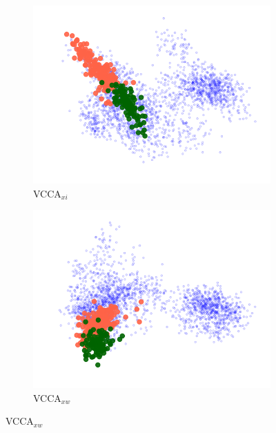 


\begin{figure}[t]
     \centering
     \begin{subfigure}[b]{0.3\textwidth}
         \centering
         \includegraphics[width=\textwidth]{figures_and_tables/latent_space_visualizations/apples_new/pca_latent_apples_vcca_xi_seed2.png}
         \caption{VCCA$_{x i}$}
         \label{fig:pca_vcca_xi_apples}
     \end{subfigure} 
     \begin{subfigure}[b]{0.3\textwidth}
         \centering
         \includegraphics[width=\textwidth]{figures_and_tables/latent_space_visualizations/apples_new/pca_latent_apples_vcca_xw_seed2.png}
         \caption{VCCA$_{x w}$}

\end{subfigure}
\end{figure}

